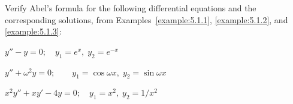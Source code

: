 \setcounter{example}{4}
\begin{example}
  \label{example:5.1.5} \rm Verify Abel's formula for the following differential equations and the
  corresponding solutions, from Examples~\ref{example:5.1.1}, \ref{example:5.1.2}, and
  \ref{example:5.1.3}:
  \begin{alist}
    \item %
    $y''-y=0;\quad y_{1}=e^{x},\;y_{2}=e^{-x}$

    \item %
    $y''+\omega^{2}y=0;\quad\quad y_{1}=\cos\omega x,\;y_{2}=\sin\omega x$

    \item %
    $x^{2}y''+xy'-4y=0;\quad y_{1}=x^{2},\;y_{2}=1/x^{2}$
  \end{alist}
\end{example}
\setcounter{equation}{30}
